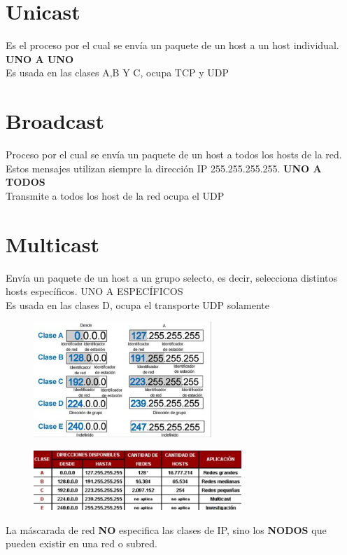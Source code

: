 \documentclass[letterpaper,12pt]{article}
\begin{document}
\begin{sloppypar}
\section{Unicast}
Es el proceso por el cual se envía un paquete de un host a un host individual. \textbf{UNO A UNO}
\vspace{0.3cm}\\ 
Es usada en las clases A,B Y C, ocupa TCP y UDP

\section{Broadcast}
Proceso por el cual se envía un paquete de un host a todos los hosts de la red. Estos mensajes utilizan siempre la dirección IP 255.255.255.255. \textbf{UNO A TODOS}
\vspace{0.3cm}\\ 
Transmite a todos los host de la red ocupa el UDP

\section{Multicast}
Envía un paquete de un host a un grupo selecto, es decir, selecciona distintos hosts específicos. UNO A ESPECÍFICOS
\vspace{0.3cm}\\ 
Es usada en las clases D, ocupa el transporte UDP solamente

\begin{figure}[H]
    \centering
    \includegraphics[width=0.6\textwidth]{images/redes 1.png}
\end{figure}


\begin{figure}[H]
    \centering
    \includegraphics[width=0.7\textwidth]{images/redes2.png}
\end{figure}

La máscarada de red \textbf{NO} especifica las clases de IP, sino los \textbf{NODOS} que pueden existir en una red o subred.



\end{sloppypar}
\end{document}
